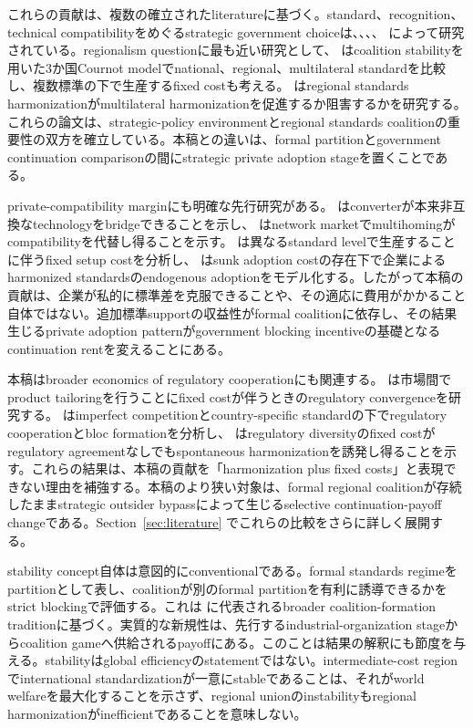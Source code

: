 これらの貢献は、複数の確立されたliteratureに基づく。standard、recognition、technical compatibilityをめぐるstrategic government choiceは、\citet{gandalShy2001}、\citet{barrettYang2001}、\citet{klimenko2009}、\citet{costinot2008} によって研究されている。regionalism questionに最も近い研究として、\citet{takaradaEtAl2020} はcoalition stabilityを用いた3か国Cournot modelでnational、regional、multilateral standardを比較し、複数標準の下で生産するfixed costも考える。\citet{kawabataTakarada2021} はregional standards harmonizationがmultilateral harmonizationを促進するか阻害するかを研究する。これらの論文は、strategic-policy environmentとregional standards coalitionの重要性の双方を確立している。本稿との違いは、formal partitionとgovernment continuation comparisonの間にstrategic private adoption stageを置くことである。

private-compatibility marginにも明確な先行研究がある。\citet{farrellSaloner1992} はconverterが本来非互換なtechnologyをbridgeできることを示し、\citet{doganogluWright2006} はnetwork marketでmultihomingがcompatibilityを代替し得ることを示す。\citet{fischerSerra2000} は異なるstandard levelで生産することに伴うfixed setup costを分析し、\citet{schmidtSteingress2022} はsunk adoption costの存在下で企業によるharmonized standardsのendogenous adoptionをモデル化する。したがって本稿の貢献は、企業が私的に標準差を克服できることや、その適応に費用がかかること自体ではない。追加標準supportの収益性がformal coalitionに依存し、その結果生じるprivate adoption patternがgovernment blocking incentiveの基礎となるcontinuation rentを変えることにある。

本稿はbroader economics of regulatory cooperationにも関連する。\citet{grossmanMcCalmanStaiger2021} は市場間でproduct tailoringを行うことにfixed costが伴うときのregulatory convergenceを研究する。\citet{parentiVannoorenberghe2025} はimperfect competitionとcountry-specific standardの下でregulatory cooperationとbloc formationを分析し、\citet{maggiMrazova2024} はregulatory diversityのfixed costがregulatory agreementなしでもspontaneous harmonizationを誘発し得ることを示す。これらの結果は、本稿の貢献を「harmonization plus fixed costs」と表現できない理由を補強する。本稿のより狭い対象は、formal regional coalitionが存続したままstrategic outsider bypassによって生じるselective continuation-payoff changeである。Section~\ref{sec:literature} でこれらの比較をさらに詳しく展開する。

stability concept自体は意図的にconventionalである。formal standards regimeをpartitionとして表し、coalitionが別のformal partitionを有利に誘導できるかをstrict blockingで評価する。これは \citet{hartKurz1983} に代表されるbroader coalition-formation traditionに基づく。実質的な新規性は、先行するindustrial-organization stageからcoalition gameへ供給されるpayoffにある。このことは結果の解釈にも節度を与える。stabilityはglobal efficiencyのstatementではない。intermediate-cost regionでinternational standardizationが一意にstableであることは、それがworld welfareを最大化することを示さず、regional unionのinstabilityもregional harmonizationがinefficientであることを意味しない。

